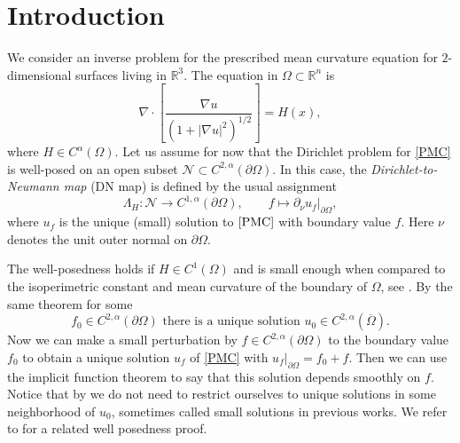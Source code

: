 \documentclass[a4paper, 10pt, twoside, notitlepage]{amsart}
\theoremstyle{plain}
\newcommand{\Om}{\Omega}
\numberwithin{equation}{section}
\newcommand {\R} {\mathbb{R}} \newcommand {\Z} {\mathbb{Z}}
\newcommand {\p} {\partial}
\newcommand{\ol}[1]{\overline{#1}}
\newcommand{\abs}[1]{\lvert #1 \rvert}
\begin{document}
\section{Introduction}
We consider an inverse problem for the prescribed mean curvature equation for $2$-dimensional surfaces living in $\R^3$. The equation in $\Omega \subset \R^n$ is 
\begin{equation}\label{PMC}
	\nabla\cdot\left[\frac{\nabla u}{(1+\abs{\nabla u}^2)^{1/2}}\right]=H(x),
\end{equation}
where $H\in C^\alpha(\Omega)$. 
Let us assume for now that the Dirichlet problem for \eqref{PMC} is well-posed on an open subset $\mathcal{N}\subset C^{2,\alpha}(\p \Omega)$.
In this case, the \emph{Dirichlet-to-Neumann map} (DN map) is defined by the usual assignment
   \begin{equation}\label{eq:DNmap}
   \Lambda_{H}: \mathcal{N}\to C^{1,\alpha}(\p \Omega), \qquad f\mapsto \left. \p_\nu u_f\right|_{\p \Omega},
   \end{equation}
   where $u_f$ is the unique (small) solution to $\eqref{PMC}$ with boundary value $f$.
     Here $\nu$ denotes the unit outer normal on $\p \Omega$. 
     
     The well-posedness holds if $H\in C^1(\Omega)$ and is small enough when compared to the isoperimetric constant and mean curvature of the boundary of $\Omega$, see \cite[Theorem 16.10]{gilbarg2001elliptic}. By the same theorem for some
     \begin{equation*}
         f_0\in C^{2,\alpha}(\p \Omega)\text{ there is a unique solution }u_{0}\in C^{2,\alpha}(\ol{\Om}).
     \end{equation*}
     Now we can make a small perturbation by $f\in C^{2,\alpha}(\p \Omega)$ to the boundary value $f_0$ to obtain a unique solution $u_f$ of \eqref{PMC} with $u_f|_{\p\Om}=f_0+f$. Then we can use the implicit function theorem to say that this solution depends smoothly on $f$. Notice that by \cite[Theorem 16.10]{gilbarg2001elliptic} we do not need to restrict ourselves to unique solutions in some neighborhood of $u_0$, sometimes called small solutions in previous works. We refer to  \cite[Theorem 2.1]{liimatainenLin2024} for a related well posedness proof. 
     
\end{document}
